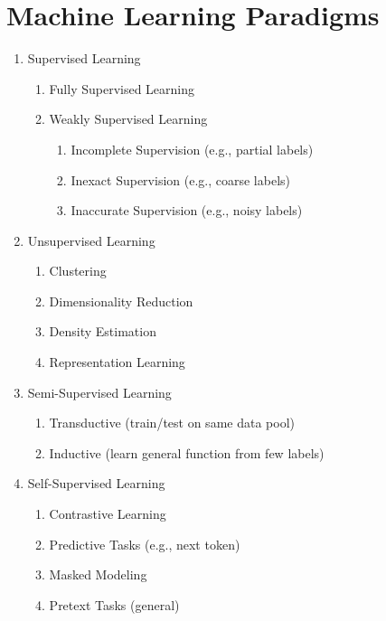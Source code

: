 \chapter{ \emojistar Machine Learning Paradigms \cite{common/online/chatgpt}}

\begin{multicols}{2}
\begin{enumerate}
    \item Supervised Learning
    \begin{enumerate}
      \item Fully Supervised Learning
      \item Weakly Supervised Learning
      \begin{enumerate}
        \item Incomplete Supervision (e.g., partial labels)
        \item Inexact Supervision (e.g., coarse labels)
        \item Inaccurate Supervision (e.g., noisy labels)
      \end{enumerate}
    \end{enumerate}

    \item Unsupervised Learning
    \begin{enumerate}
      \item Clustering
      \item Dimensionality Reduction
      \item Density Estimation
      \item Representation Learning
    \end{enumerate}

    \item Semi-Supervised Learning
    \begin{enumerate}
      \item Transductive (train/test on same data pool)
      \item Inductive (learn general function from few labels)
    \end{enumerate}

    \item Self-Supervised Learning
    \begin{enumerate}
      \item Contrastive Learning
      \item Predictive Tasks (e.g., next token)
      \item Masked Modeling
      \item Pretext Tasks (general)
    \end{enumerate}


\end{enumerate}
\end{multicols}
